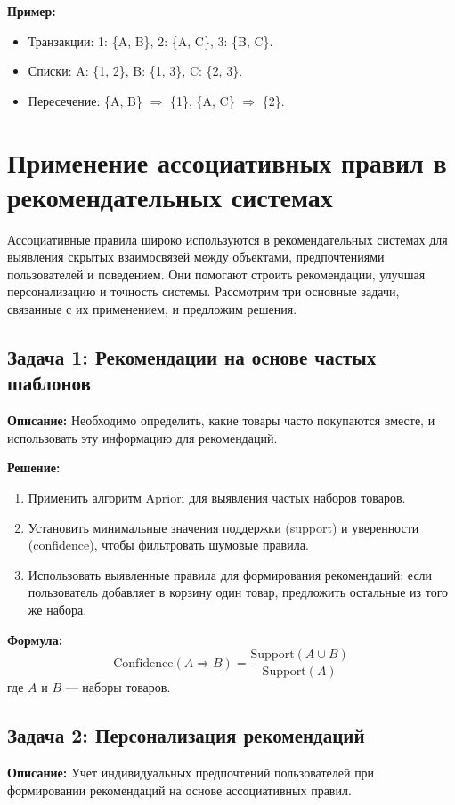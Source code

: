 \textbf{Пример:}

\begin{itemize}
    \item Транзакции: 1: \{A, B\}, 2: \{A, C\}, 3: \{B, C\}.
    \item Списки: A: \{1, 2\}, B: \{1, 3\}, C: \{2, 3\}.
    \item Пересечение: \{A, B\} $\Rightarrow$ \{1\}, \{A, C\} $\Rightarrow$ \{2\}.
\end{itemize}

\section{Применение ассоциативных правил в рекомендательных системах}

Ассоциативные правила широко используются в рекомендательных системах для выявления скрытых взаимосвязей между объектами, предпочтениями пользователей и поведением. Они помогают строить рекомендации, улучшая персонализацию и точность системы. Рассмотрим три основные задачи, связанные с их применением, и предложим решения.

\subsection{Задача 1: Рекомендации на основе частых шаблонов}
\textbf{Описание:} 
Необходимо определить, какие товары часто покупаются вместе, и использовать эту информацию для рекомендаций.

\textbf{Решение:}
\begin{enumerate}
    \item Применить алгоритм Apriori для выявления частых наборов товаров.
    \item Установить минимальные значения поддержки (support) и уверенности (confidence), чтобы фильтровать шумовые правила.
    \item Использовать выявленные правила для формирования рекомендаций: если пользователь добавляет в корзину один товар, предложить остальные из того же набора.
\end{enumerate}

\textbf{Формула:}
\begin{equation}
    \text{Confidence}(A \Rightarrow B) = \frac{\text{Support}(A \cup B)}{\text{Support}(A)}
\end{equation}
где $A$ и $B$ — наборы товаров.

\subsection{Задача 2: Персонализация рекомендаций}
\textbf{Описание:}
Учет индивидуальных предпочтений пользователей при формировании рекомендаций на основе ассоциативных правил.

